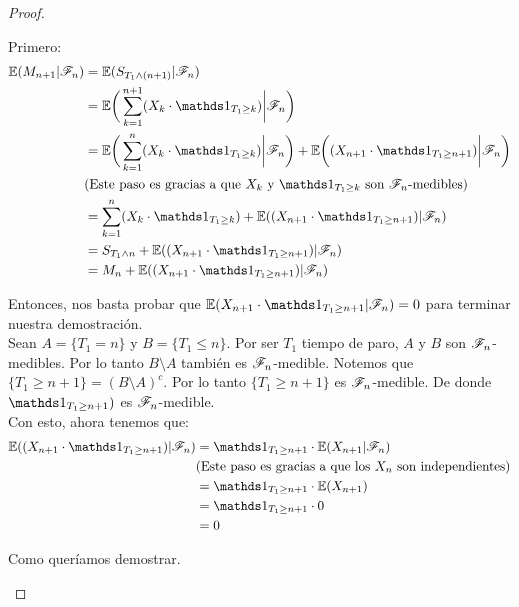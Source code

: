 \begin{proof}
\begin{itemize}
				Primero:
				\begin{align}
					\E(M_{n+1} | \F_{n}) 	&=		\E( S_{T_1 \wedge (n+1)} | \F_{n}) \\ 
											&=		\E\bigg( \sum_{k=1}^{n+1} (X_k \cdot \indic_{T_1 \geq k})\bigg| \F_{n}\bigg) \\	 			
											&=		\E\bigg( \sum_{k=1}^{n} (X_k \cdot \indic_{T_1 \geq k}) \bigg| \F_{n}\bigg) +
													\E\bigg((X_{n+1} \cdot \indic_{T_1 \geq n+1}) \bigg| \F_{n}\bigg) \\
												&\mbox{(Este paso es gracias a que ${X_k}$ y ${\indic_{T_1 \geq k}}$ son ${\F_n}$-medibles)}\\
											& = 	\sum_{k=1}^{n} (X_k \cdot \indic_{T_1 \geq k}) + 
													\E((X_{n+1} \cdot \indic_{T_1 \geq n+1}) | \F_{n}) \\
											& = 	S_{T_1 \wedge n} + \E((X_{n+1} \cdot \indic_{T_1 \geq n+1}) | \F_{n}) \\
											& = 	M_n + \E((X_{n+1} \cdot \indic_{T_1 \geq n+1}) | \F_{n})
				\end{align}
				
				Entonces, nos basta probar que ${\E(X_{n+1} \cdot \indic_{T_1 \geq n+1} |
				 \F_{n}) = 0}$ para terminar nuestra demostración.\\
				 
				Sean ${A = \{T_1 = n\}}$ y ${B = \{ T_1 \leq n\}}$. Por ser ${T_1}$ tiempo de paro,
				${A}$ y ${B}$ son ${\mathscr{F}_n}$-medibles. Por lo tanto ${B \setminus A}$ también es ${\mathscr{F}_n}$-medible. 
				Notemos que ${\{T_1 \geq n+1\} = (B \setminus A)^c}$. Por lo tanto ${\{T_1 \geq n+1\}}$ es
				${\mathscr{F}_n}$-medible. De donde  ${\indic_{T_1 \geq n+1})}$ es ${\mathscr{F}_n}$-medible.\\
				
				Con esto, ahora tenemos que:
				\begin{align}
					\E((X_{n+1} \cdot \indic_{T_1 \geq n+1}) | \F_{n}) 	&= \indic_{T_1 \geq n+1} \cdot \E(X_{n+1} | \F_{n}) \\
																		&\mbox{(Este paso es gracias a que los ${X_n}$ son independientes)} \\
																		&=\indic_{T_1 \geq n+1} \cdot \E(X_{n+1} ) \\
																		&=\indic_{T_1 \geq n+1} \cdot 0 \\
																		&= 0
				\end{align}	
				
				Como queríamos demostrar.
		\end{itemize}
		

\end{proof}
